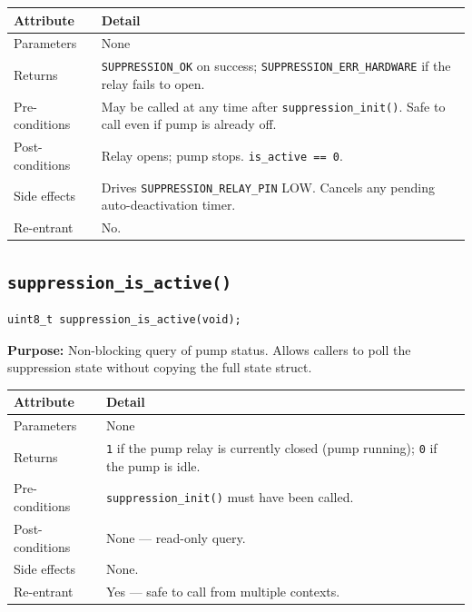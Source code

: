 \documentclass[12pt]{article}
\begin{document}
\begin{table}[H]
\centering\small
\begin{tabularx}{\textwidth}{L{3.5cm} X}
\toprule
\textbf{Attribute} & \textbf{Detail} \\
\midrule
Parameters & None \\
Returns & \texttt{SUPPRESSION\_OK} on success; \texttt{SUPPRESSION\_ERR\_HARDWARE} if the relay fails to open. \\
Pre-conditions & May be called at any time after \texttt{suppression\_init()}. Safe to call even if pump is already off. \\
Post-conditions & Relay opens; pump stops. \texttt{is\_active == 0}. \\
Side effects & Drives \texttt{SUPPRESSION\_RELAY\_PIN} LOW. Cancels any pending auto-deactivation timer. \\
Re-entrant & No. \\
\bottomrule
\end{tabularx}
\end{table}

\subsection{\texttt{suppression\_is\_active()}}

\begin{lstlisting}[style=cstyle, numbers=none]
uint8_t suppression_is_active(void);
\end{lstlisting}

\textbf{Purpose:} Non-blocking query of pump status. Allows callers to poll the suppression state without copying the full state struct.

\begin{table}[H]
\centering\small
\begin{tabularx}{\textwidth}{L{3.5cm} X}
\toprule
\textbf{Attribute} & \textbf{Detail} \\
\midrule
Parameters & None \\
Returns & \texttt{1} if the pump relay is currently closed (pump running); \texttt{0} if the pump is idle. \\
Pre-conditions & \texttt{suppression\_init()} must have been called. \\
Post-conditions & None --- read-only query. \\
Side effects & None. \\
Re-entrant & Yes --- safe to call from multiple contexts. \\
\bottomrule
\end{tabularx}
\end{table}
\end{document}
